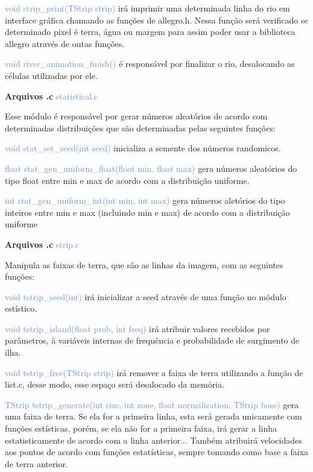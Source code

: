 \documentclass[a4paper,12pt]{article}
\begin{document}
{\textcolor{CornflowerBlue}{void strip\_print(TStrip strip)}} irá imprimir uma determinada linha do rio em interface gráfica 
chamando as funções de allegro.h. Nessa função será verificado se determinado pixel é terra, água ou margem para assim poder
usar a biblioteca allegro através de outas funções.

{\textcolor{CornflowerBlue}{void river\_animation\_finish()}} é responsável por finalizar o rio, desalocando as células utilizadas por ele.

\bigskip
\bigskip
\bigskip
\bigskip
\bigskip

{\Large \textcolor{NavyBlue}{ \textbf{Arquivos .c  }}}{\large \textcolor{CornflowerBlue}{  statistical.c}}
\bigskip

Esse módulo é responsável por gerar números aleatórios de acordo com determinadas distribuições que são determinadas pelas seguintes funções:

{\textcolor{CornflowerBlue}{void stat\_set\_seed(int seed)}} inicializa a semente dos números randomicos.

{\textcolor{CornflowerBlue}{float stat\_gen\_uniform\_float(float min, float max)}} gera números aleatórios do tipo float entre min e max de acordo com a distribuição uniforme.

{\textcolor{CornflowerBlue}{int stat\_gen\_uniform\_int(int min, int max)}} gera números aletórios do tipo inteiros entre min e max (incluindo min e max) de acordo com a distribuição uniforme

\newpage %


{\Large \textcolor{NavyBlue}{ \textbf{Arquivos .c  }}}{\large \textcolor{CornflowerBlue}{  strip.c}}
\bigskip

Manipula as faixas de terra, que são as linhas da imagem, com as seguintes funções:

{\textcolor{CornflowerBlue}{void   tstrip\_seed(int)}} irá inicializar a seed através de uma função no módulo estístico.

{\textcolor{CornflowerBlue}{void tstrip\_island(float prob, int freq)}} irá atribuir valores recebidos por parâmetros, à variáveis internas de frequência e probabilidade de surgimento de ilha.

{\textcolor{CornflowerBlue}{void tstrip\_free(TStrip strip)}} irá remover a faixa de terra utilizando a função de list.c, desse modo, esse espaço será desalocado da memória.

{\textcolor{CornflowerBlue}{TStrip tstrip\_generate(int size, int zone, float normalization, TStrip base)}} gera uma faixa de terra. Se ela for a primeira linha, esta será gerada unicamente com funções estísticas, porém, se ela não for a primeira faixa, irá gerar a linha estatisticamente de acordo com a linha anterior... Também atribuirá velocidades aos pontos de acordo com funções estatísticas, sempre tomando como base a faixa de terra anterior. 
\end{document}
